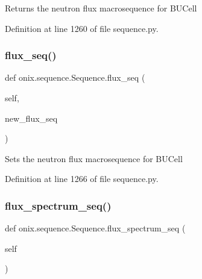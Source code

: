 \begin{DoxyVerb}Returns the neutron flux macrosequence for BUCell
\end{DoxyVerb}
 

Definition at line 1260 of file sequence.\+py.

\mbox{\label{classonix_1_1sequence_1_1Sequence_aad160c741c397ef1dfe8ed927e8f199f}} 
\subsubsection{\texorpdfstring{flux\+\_\+seq()}{flux\_seq()}\hspace{0.1cm}{\footnotesize\ttfamily [2/2]}}
{\footnotesize\ttfamily def onix.\+sequence.\+Sequence.\+flux\+\_\+seq (\begin{DoxyParamCaption}\item[{}]{self,  }\item[{}]{new\+\_\+flux\+\_\+seq }\end{DoxyParamCaption})}

\begin{DoxyVerb}Sets the neutron flux macrosequence for BUCell
\end{DoxyVerb}
 

Definition at line 1266 of file sequence.\+py.

\mbox{\label{classonix_1_1sequence_1_1Sequence_a36aa488bccd1ef500741808076fff801}} 
\subsubsection{\texorpdfstring{flux\+\_\+spectrum\+\_\+seq()}{flux\_spectrum\_seq()}\hspace{0.1cm}{\footnotesize\ttfamily [1/2]}}
{\footnotesize\ttfamily def onix.\+sequence.\+Sequence.\+flux\+\_\+spectrum\+\_\+seq (\begin{DoxyParamCaption}\item[{}]{self }\end{DoxyParamCaption})}

